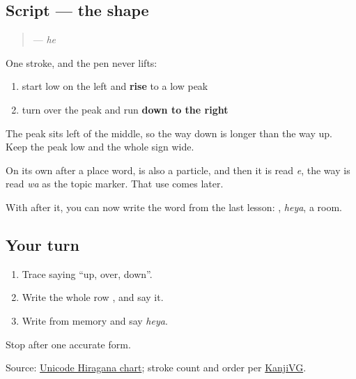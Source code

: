 \subsection*{Script — the shape}

\begin{quote}
\textbf{} — \emph{he}
\end{quote}

One stroke, and the pen never lifts:

\begin{enumerate}
\raggedright
  \item start low on the left and \textbf{rise} to a low peak
  \item turn over the peak and run \textbf{down to the right}
\end{enumerate}

The peak sits left of the middle, so the way down is longer than the way up. Keep the peak low and the whole sign wide.

On its own after a place word, \textbf{} is also a particle, and then it is read \emph{e}, the way \textbf{} is read \emph{wa} as the topic marker. That use comes later.

With \textbf{} after it, you can now write the word from the last lesson: \textbf{}, \emph{heya}, a room.

\subsection*{Your turn}
\begin{enumerate}
\raggedright
  \item Trace \textbf{} saying \textquotedblleft{}up, over, down\textquotedblright{}.
  \item Write the whole row \textbf{    }, and say it.
  \item Write \textbf{} from memory and say \emph{heya}.
\end{enumerate}

\begin{tcolorbox}[breakable,colback=teal!4,colframe=teal!35!black,title={Before you move on}]
Stop after one accurate form.

Source: \href{https://www.unicode.org/charts/PDF/U3040.pdf}{Unicode Hiragana chart}; stroke count and order per \href{https://kanjivg.tagaini.net/kanjivg/kanji/03078.html}{KanjiVG}.
\end{tcolorbox}
